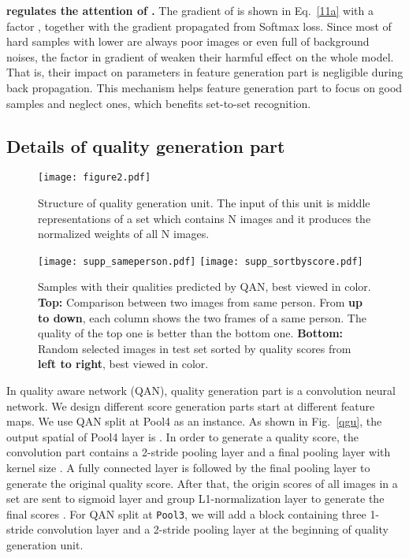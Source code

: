 \documentclass[10pt,twocolumn,letterpaper]{article}
\begin{document}
\textbf{ regulates the attention of .}
The gradient of  is shown in Eq.~\ref{11a} with a factor  , together with the gradient propagated from Softmax loss. Since most of hard samples with lower  are always poor images or even full of background noises, the factor  in gradient of   weaken their harmful effect on the whole model. That is, their impact on parameters in feature generation part is negligible during back propagation. This mechanism helps feature generation part to focus on good samples and neglect ones, which benefits set-to-set recognition.























\subsection{Details of quality generation part}
\label{details_qgp}

\begin{figure}[!htbp]
  \centering
  \texttt{[image: figure2.pdf]}
  \caption{Structure of quality generation unit. The input of this unit is middle representations of a set which contains N images and it produces the normalized weights of all N images.}
  \label{qgu}
\label{figure2}
\end{figure}



\begin{figure*}[!ht]
  \centering
  \texttt{[image: supp\_sameperson.pdf]}
  \texttt{[image: supp\_sortbyscore.pdf]}
  \caption{Samples with their qualities predicted by QAN, best viewed in color. \textbf{Top:} Comparison between two images from same person. From \textbf{up to down}, each column shows the two frames of a same person. The quality of the top one is better than the bottom one. \textbf{Bottom:} Random selected images in test set sorted by quality scores from \textbf{left to right}, best viewed in color.}
  \label{fig:samples}
\end{figure*}

In quality aware network (QAN), quality generation part is a  convolution neural network. We design different score generation parts start at different feature maps. We use QAN split at Pool4 as an instance. As shown in Fig.~\ref{qgu}, the output spatial of Pool4 layer is . In order to generate a  quality score, the convolution part contains a 2-stride pooling layer and a final pooling layer with kernel size . A fully connected layer is followed by the final pooling layer to generate the original quality score. After that, the origin scores of all images in a set are sent to sigmoid layer and group L1-normalization layer to generate the final scores . For QAN split at \texttt{Pool3}, we will add a block containing three 1-stride convolution layer and a 2-stride pooling layer at the beginning of quality generation unit. 
\end{document}
